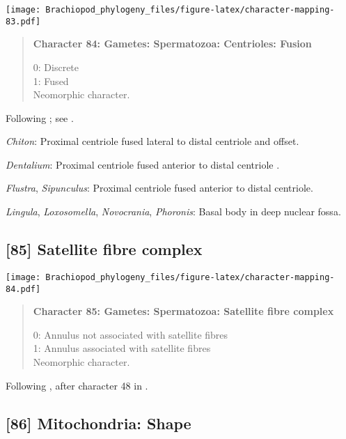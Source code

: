 \documentclass[openany]{book}
\theoremstyle{definition}
\theoremstyle{definition}
\theoremstyle{definition}
\theoremstyle{remark}
\begin{document}
\texttt{[image: Brachiopod\_phylogeny\_files/figure-latex/character-mapping-83.pdf]}

\begin{quote}
\textbf{Character 84: Gametes: Spermatozoa: Centrioles: Fusion}

0: Discrete\\
1: Fused\\
Neomorphic character.
\end{quote}

Following \citet{Smith2012}; see \citet{BucklandNicks2008}.

\hypertarget{Chiton-coding-84}{}
\emph{Chiton}: Proximal centriole fused lateral to distal centriole and
offset.

\hypertarget{Dentalium-coding-84}{}
\emph{Dentalium}: Proximal centriole fused anterior to distal centriole
\citep{DufresneDube1983}.

\hypertarget{Flustra-coding-84}{}
\emph{Flustra}, \emph{Sipunculus}: Proximal centriole fused anterior to
distal centriole.

\hypertarget{Lingula-coding-84}{}
\emph{Lingula}, \emph{Loxosomella}, \emph{Novocrania}, \emph{Phoronis}:
Basal body in deep nuclear fossa.

\subsection*{{[}85{]} Satellite fibre
complex}\label{satellite-fibre-complex}

\texttt{[image: Brachiopod\_phylogeny\_files/figure-latex/character-mapping-84.pdf]}

\begin{quote}
\textbf{Character 85: Gametes: Spermatozoa: Satellite fibre complex}

0: Annulus not associated with satellite fibres\\
1: Annulus associated with satellite fibres\\
Neomorphic character.
\end{quote}

Following \citet{Smith2012}, after character 48 in \citet{Ponder1997}.

\subsection*{{[}86{]} Mitochondria: Shape}\label{mitochondria-shape}
\end{document}
